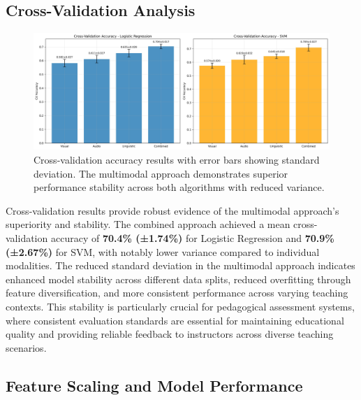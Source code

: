 \subsection{Cross-Validation Analysis}

\begin{figure}[H]
    \centering
    \includegraphics[width=\textwidth]{sections/cross_validation_comparison.jpg}
    \caption{Cross-validation accuracy results with error bars showing standard deviation. The multimodal approach demonstrates superior performance stability across both algorithms with reduced variance.}
    \label{fig:cross_validation}
\end{figure}

Cross-validation results provide robust evidence of the multimodal approach's superiority and stability. The combined approach achieved a mean cross-validation accuracy of \textbf{70.4\% (±1.74\%)} for Logistic Regression and \textbf{70.9\% (±2.67\%)} for SVM, with notably lower variance compared to individual modalities. The reduced standard deviation in the multimodal approach indicates enhanced model stability across different data splits, reduced overfitting through feature diversification, and more consistent performance across varying teaching contexts. This stability is particularly crucial for pedagogical assessment systems, where consistent evaluation standards are essential for maintaining educational quality and providing reliable feedback to instructors across diverse teaching scenarios.

\subsection{Feature Scaling and Model Performance}

